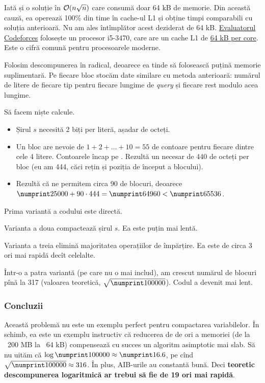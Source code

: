 \documentclass[../main.tex]{subfiles}
\begin{document}
Iată și o soluție în $\mathcal{O}(n \sqrt{n})$ care consumă doar 64 kB de memorie. Din această cauză, ea operează 100\% din time în cache-ul L1 și obține timpi comparabili cu soluția anterioară. Nu am ales întîmplător acest deziderat de 64 kB. \href{https://codeforces.com/blog/entry/57248}{Evaluatorul Codeforces} folosește un procesor i5-3470, care are un cache L1 de \href{https://www.techpowerup.com/cpu-specs/core-i5-3470.c1039}{64 kB per core}. Este o cifră comună pentru procesoarele moderne.

Folosim descompunerea în radical, deoarece ea tinde să folosească puțină memorie suplimentară. Pe fiecare bloc stocăm date similare cu metoda anterioară: numărul de litere de fiecare tip pentru fiecare lungime de \textit{query} și fiecare rest modulo acea lungime.

Să facem niște calcule.

\begin{itemize}
  \item Șirul $s$ necesită 2 biți per literă, așadar  de octeți.

  \item Un bloc are nevoie de $1 + 2 + \dots + 10 = 55$ de contoare pentru fiecare dintre cele 4 litere. Contoarele încap pe . Rezultă un necesar de 440 de octeți per bloc (eu am 444, căci rețin și poziția de început a blocului).

  \item Rezultă că ne permitem circa 90 de blocuri, deoarece $\np{25000} + 90 \cdot 444 = \np{64960} < \np{65536}$.
\end{itemize}

Prima variantă a codului este directă.

Varianta a doua compactează șirul $s$. Ea este puțin mai lentă.

Varianta a treia elimină majoritatea operațiilor de împărțire. Ea este de circa 3 ori mai rapidă decît celelalte.

Într-o a patra variantă (pe care nu o mai includ), am crescut numărul de blocuri pînă la 317 (valoarea teoretică, $\sqrt{\np{100000}}$). Codul a devenit mai lent.

\subsubsection*{Concluzii}

Această problemă nu este un exemplu perfect pentru compactarea variabilelor. În schimb, ea este un exemplu instructiv că reducerea de  de ori a memoriei (de la ~200 MB la ~64 kB) compensează cu succes un algoritm asimptotic mai slab. Să nu uităm că $\log \np{100000} \approx \np{16.6}$, pe cînd $\sqrt{\np{100000}} \approx 316$. În plus, AIB-urile au constantă bună. Deci \textbf{teoretic descompunerea logaritmică ar trebui să fie de 19 ori mai rapidă}.
\end{document}
